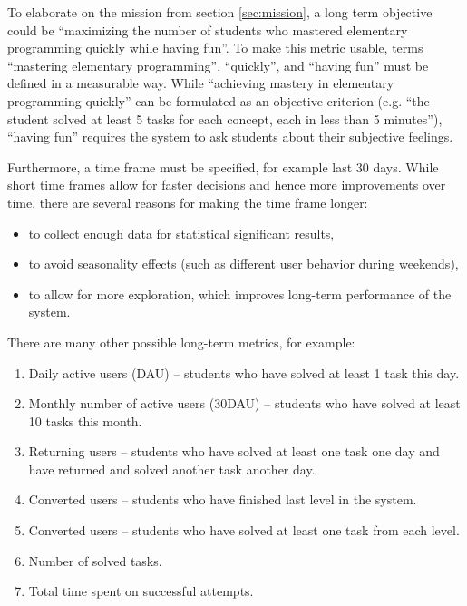 To elaborate on the mission from section \ref{sec:mission},
  a long term objective could be
  ``maximizing the number of students
  who mastered elementary programming quickly while having fun''.
To make this metric usable,
  terms ``mastering elementary programming'', ``quickly'', and ``having fun''
  must be defined in a measurable way.
While ``achieving mastery in elementary programming quickly'' can be
  formulated as an objective criterion
  (e.g. ``the student solved at least 5 tasks for each concept, each in less than 5 minutes''),
  ``having fun'' requires the system to ask students about their subjective feelings.

Furthermore, a time frame must be specified, for example last 30 days.
While short time frames allow for faster decisions and hence more improvements over time,
there are several reasons for making the time frame longer:
\begin{itemize}
  \item to collect enough data for statistical significant results,
  \item to avoid seasonality effects (such as different user behavior during weekends),
  \item to allow for more exploration, which improves long-term performance of the system.
\end{itemize}

There are many other possible long-term metrics, for example:
\begin{enumerate}
  \item Daily active users (DAU) -- students who have solved at least 1 task this day.
  \item Monthly number of active users (30DAU) -- students who have solved at least 10 tasks this month.
  \item Returning users -- students who have solved at least one task one day and have returned and solved another task another day.
  \item Converted users -- students who have finished last level in the system.
  \item Converted users -- students who have solved at least one task from each level.
  \item Number of solved tasks.
  \item Total time spent on successful attempts.
\end{enumerate}

